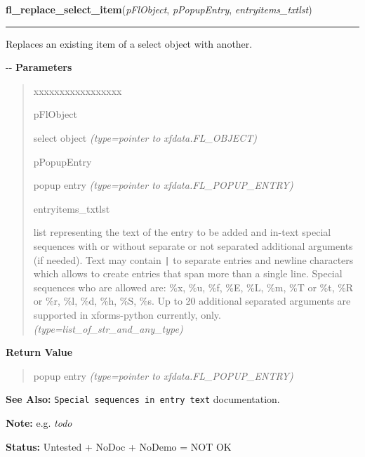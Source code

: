 \hspace{.8\funcindent}\begin{boxedminipage}{\funcwidth}

    \raggedright \textbf{fl\_replace\_select\_item}(\textit{pFlObject}, \textit{pPopupEntry}, \textit{entryitems\_txtlst})

    \vspace{-1.5ex}

    \rule{\textwidth}{0.5\fboxrule}
\setlength{\parskip}{2ex}

Replaces an existing item of a select object with another.

-{}-
\setlength{\parskip}{1ex}
      \textbf{Parameters}
      \vspace{-1ex}

      \begin{quote}
        \begin{Ventry}{xxxxxxxxxxxxxxxxx}

          \item[pFlObject]


select object
            {\it (type=pointer to xfdata.FL\_OBJECT)}

          \item[pPopupEntry]


popup entry
            {\it (type=pointer to xfdata.FL\_POPUP\_ENTRY)}

          \item[entryitems\_txtlst]


list representing the text of the entry to be added and in-text
special sequences with or without separate or not separated additional
arguments (if needed). Text may contain \texttt{|} to separate entries and
newline characters which allows to create entries that span more than
a single line. Special sequences who are allowed are: \%x, \%u, \%f, \%E,
\%L, \%m, \%T or \%t, \%R or \%r, \%l, \%d, \%h, \%S, \%s. Up to 20 additional
separated arguments are supported in xforms-python currently, only.
            {\it (type=list\_of\_str\_and\_any\_type)}

        \end{Ventry}

      \end{quote}

      \textbf{Return Value}
    \vspace{-1ex}

      \begin{quote}

popup entry
      {\it (type=pointer to xfdata.FL\_POPUP\_ENTRY)}

      \end{quote}

\textbf{See Also:} 
\texttt{Special sequences in entry text} documentation.


\textbf{Note:} 
e.g. \emph{todo}


\textbf{Status:} 
Untested + NoDoc + NoDemo = NOT OK


    \end{boxedminipage}

